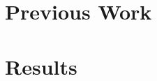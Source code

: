 \documentclass[12pt]{ucthesis}
\begin{document}
\chapter{Previous Work}
\label{previous-work}


\chapter{Results}
\label{results}



\clearpage


\end{document}
